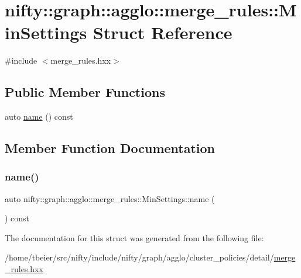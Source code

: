 \hypertarget{structnifty_1_1graph_1_1agglo_1_1merge__rules_1_1MinSettings}{}\section{nifty\+:\+:graph\+:\+:agglo\+:\+:merge\+\_\+rules\+:\+:Min\+Settings Struct Reference}
\label{structnifty_1_1graph_1_1agglo_1_1merge__rules_1_1MinSettings}


{\ttfamily \#include $<$merge\+\_\+rules.\+hxx$>$}

\subsection*{Public Member Functions}
\begin{DoxyCompactItemize}
\item 
auto \hyperlink{structnifty_1_1graph_1_1agglo_1_1merge__rules_1_1MinSettings_a3e07dff9470a16bb2a9a9777af6f1cf9}{name} () const
\end{DoxyCompactItemize}


\subsection{Member Function Documentation}
\mbox{\label{structnifty_1_1graph_1_1agglo_1_1merge__rules_1_1MinSettings_a3e07dff9470a16bb2a9a9777af6f1cf9}} 
\subsubsection{\texorpdfstring{name()}{name()}}
{\footnotesize\ttfamily auto nifty\+::graph\+::agglo\+::merge\+\_\+rules\+::\+Min\+Settings\+::name (\begin{DoxyParamCaption}{ }\end{DoxyParamCaption}) const\hspace{0.3cm}{\ttfamily [inline]}}



The documentation for this struct was generated from the following file\+:\begin{DoxyCompactItemize}
\item 
/home/tbeier/src/nifty/include/nifty/graph/agglo/cluster\+\_\+policies/detail/\hyperlink{merge__rules_8hxx}{merge\+\_\+rules.\+hxx}\end{DoxyCompactItemize}

